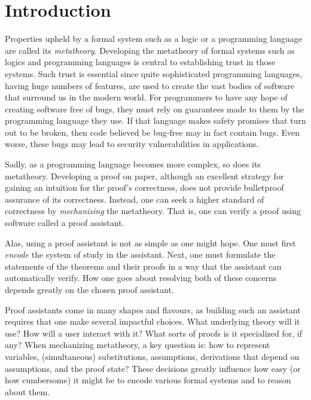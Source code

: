 \chapter{Introduction}
\label{chap:introduction}

Properties upheld by a formal system such as a logic or a programming language
are called its \emph{metatheory}.
Developing the metatheory of formal systems such as logics and programming
languages is central to establishing trust in those systems.
Such trust is essential since quite sophisticated programming languages, having
huge numbers of features, are used to create the vast bodies of software that
surround us in the modern world.
For programmers to have any hope of creating software free of bugs, they must
rely on guarantees made to them by the programming language they use.
If that language makes safety promises that turn out to be broken, then code
believed be bug-free may in fact contain bugs.
Even worse, these bugs may lead to security vulnerabilities in applications.

Sadly, as a programming language becomes more complex, so does its metatheory.
Developing a proof on paper, although an excellent strategy for gaining an
intuition for the proof's correctness, does not provide bulletproof assurance of
its correctness.
Instead, one can seek a higher standard of correctness by \emph{mechanizing} the
metatheory.
That is, one can verify a proof using software called a proof assistant.

Alas, using a proof assistant is not as simple as one might hope.
One must first \emph{encode} the system of study in the assistant.
Next, one must formulate the statements of the theorems and their proofs in a
way that the assistant can automatically verify.
How one goes about resolving both of these concerns depends greatly on the
chosen proof assistant.

Proof assistants come in many shapes and flavours, as building such an
assistant requires that one make several impactful choices.
What underlying theory will it use?
How will a user interact with it?
What sorts of proofs is it specialized for, if any?
When mechanizing metatheory, a key question is:
how to represent variables, (simultaneous) substitutions, assumptions,
derivations that depend on assumptions, and the proof state?
These decisions greatly influence how easy (or how cumbersome) it might be to
encode various formal systems and to reason about them.

